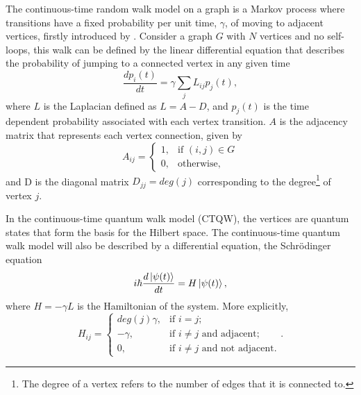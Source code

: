 \documentclass[../../dissertation.tex]{subfiles}
\begin{document}
The continuous-time random walk model on a graph is a Markov process where
transitions have a fixed probability per unit time, $\gamma$, of moving to
adjacent vertices, firstly introduced by \cite{montrollweiss1965}. Consider a
graph $G$ with $N$ vertices and no self-loops, this walk can be defined by the
linear differential equation that describes the probability of jumping to a
connected vertex in any given time 
\begin{equation}
	\frac{dp_i(t)}{dt} = \gamma \sum_j L_{ij} p_j(t), \label{eq:classicalContWalk}
\end{equation}
where $L$ is the Laplacian defined as $L = A - D$, and $p_j(t)$ is the time
dependent probability associated with each vertex transition. $A$ is the
adjacency matrix that represents each vertex connection, given by
\begin{equation}
	A_{ij} = \begin{cases} 1, & \mbox{if } (i,j)\in G \\ 0, & \mbox{otherwise,} \end{cases}
\end{equation}
and D is the diagonal matrix $D_{jj} = deg(j)$ corresponding to the
degree\footnote{The degree of a vertex refers to the number of edges that it is
connected to.} of vertex $j$.\par 

In the continuous-time quantum walk model (CTQW), the vertices are quantum
states that form the basis for the Hilbert space. The continuous-time quantum
walk model will also be described by a differential equation, the Schrödinger
equation
\begin{equation}
	i\hbar \frac{d\ket{\psi(t)}}{dt} = H \ket{\psi(t)}, \label{shrodinger}
\end{equation}
where $H = -\gamma L$ is the Hamiltonian of the system. More explicitly,
\begin{equation}
	H_{ij} = \begin{cases} 
		deg(j)\gamma, & \mbox{if } i= j; \\ 
		-\gamma, & \mbox{if } i\neq j\mbox{ and adjacent};\\
		0, & \mbox{if } i\neq j\mbox{ and not adjacent}.
	\end{cases}.
	\label{Hamilt}
\end{equation}\par
\end{document}
